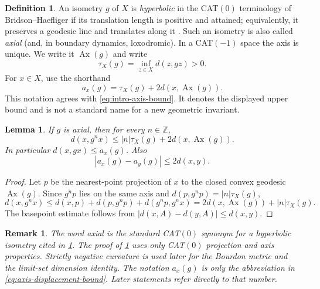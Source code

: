 \documentclass[11pt]{article}
\newtheorem{lemma}[lemma]{Lemma}
\newtheorem{remark}[remark]{Remark}
\theoremstyle{definition}
\newtheorem{definition}[definition]{Definition}
\newcommand{\Ax}{\operatorname{Ax}}
\newcommand{\Z}{\mathbb Z}
\begin{document}
\begin{definition}
\label{def:hyperbolic-axis-bound}
An isometry $g$ of $X$ is \emph{hyperbolic} in the CAT$(0)$ terminology of
Bridson--Haefliger if its translation length is positive and attained; equivalently, it preserves
a geodesic line and translates along it
\cite[Chapter~II.6, Definition~6.3 and Theorem~6.8]{BridsonHaefliger1999}.
Such an isometry is also called \emph{axial} (and, in boundary dynamics, loxodromic).
In a CAT$(-1)$ space the axis is unique. We write it $\Ax(g)$ and write
\[
 \tau_X(g)=\inf_{z\in X}d(z,gz)>0.
\]
For $x\in X$, use the shorthand
\begin{equation}\label{eq:axis-displacement-bound}
 a_x(g)=\tau_X(g)+2d(x,\Ax(g)).
\end{equation}
This notation agrees with \eqref{eq:intro-axis-bound}.  It denotes the displayed upper bound
and is not a standard name for a new geometric invariant.
\end{definition}

\begin{lemma}
\label{lem:axis-power}
If $g$ is axial, then for every $n\in\Z$,
\begin{equation}\label{eq:axis-power}
 d(x,g^n x)\le |n|\tau_X(g)+2d(x,\Ax(g)).
\end{equation}
In particular $d(x,gx)\le a_x(g)$.  Also
\begin{equation}\label{eq:axial-basepoint}
 |a_x(g)-a_y(g)|\le2d(x,y).
\end{equation}
\end{lemma}

\begin{proof}
Let $p$ be the nearest-point projection of $x$ to the closed convex geodesic $\Ax(g)$.  Since
$g^np$ lies on the same axis and $d(p,g^np)=|n|\tau_X(g)$,
\[
 d(x,g^nx)
 \le d(x,p)+d(p,g^np)+d(g^np,g^nx)
 =2d(x,\Ax(g))+|n|\tau_X(g).
\]
The basepoint estimate follows from
$|d(x,A)-d(y,A)|\le d(x,y)$.
\end{proof}

\begin{remark}
The word \emph{axial} is the standard CAT$(0)$ synonym for a hyperbolic isometry cited in
\cref{def:hyperbolic-axis-bound}.  The proof of \cref{lem:axis-power} uses only CAT$(0)$ projection
and axis properties.  Strictly negative curvature is used later for the Bourdon metric and the
limit-set dimension identity.  The notation $a_x(g)$ is only the abbreviation in
\eqref{eq:axis-displacement-bound}. Later statements refer directly to that number.
\end{remark}
\end{document}
